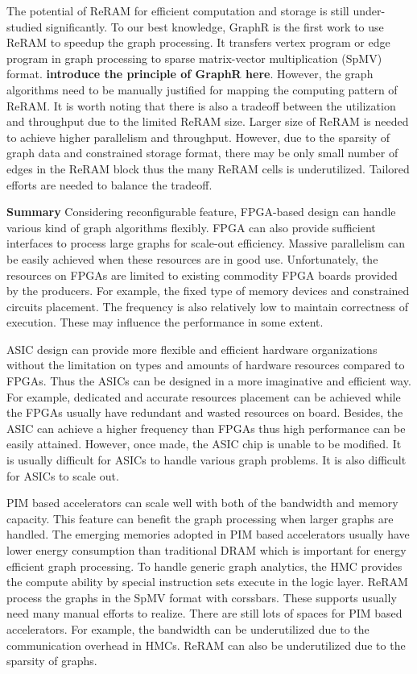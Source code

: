 \documentclass[twoside]{article}
\begin{document}
\begin{multicols}{2}
The potential of ReRAM for efficient computation and storage is still under-studied significantly. To our best knowledge, GraphR \cite{song2018graphr} is the first work to use ReRAM to speedup the graph processing. It transfers vertex program or edge program in graph processing to sparse matrix-vector multiplication (SpMV) format. {\bf introduce the principle of GraphR here}. However, the graph algorithms need to be manually justified for mapping the computing pattern of ReRAM. It is worth noting that there is also a tradeoff between the utilization and throughput due to the limited ReRAM size. Larger size of ReRAM is needed to achieve higher parallelism and throughput. However, due to the sparsity of graph data and constrained storage format, there may be only small number of edges in the ReRAM block thus the many ReRAM cells is underutilized. Tailored efforts are needed to balance the tradeoff.

{\bf Summary}
Considering reconfigurable feature, FPGA-based design can handle various kind of graph algorithms flexibly. FPGA can also provide sufficient interfaces to process large graphs for scale-out efficiency. Massive parallelism can be easily achieved when these resources are in good use. Unfortunately, the resources on FPGAs are limited to existing commodity FPGA boards provided by the producers. For example, the fixed type of memory devices and constrained circuits placement. The frequency is also relatively low to maintain correctness of execution. These may influence the performance in some extent.

ASIC design can provide more flexible and efficient hardware organizations without the limitation on types and amounts of hardware resources compared to FPGAs. Thus the ASICs can be designed in a more imaginative and efficient way. For example, dedicated and accurate resources placement can be achieved while the FPGAs usually have redundant and wasted resources on board. Besides, the ASIC can achieve a higher frequency than FPGAs thus high performance can be easily attained. However, once made, the ASIC chip is unable to be modified. It is usually difficult for ASICs to handle various graph problems. It is also difficult for ASICs to scale out.

PIM based accelerators can scale well with both of the bandwidth and memory capacity. This feature can benefit the graph processing when larger graphs are handled. The emerging memories adopted in PIM based accelerators usually have lower energy consumption than traditional DRAM which is important for energy efficient graph processing. To handle generic graph analytics, the HMC provides the compute ability by special instruction sets execute in the logic layer. ReRAM process the graphs in the SpMV format with corssbars. These supports usually need many manual efforts to realize. There are still lots of spaces for PIM based accelerators. For example, the bandwidth can be underutilized due to the communication overhead in HMCs. ReRAM can also be underutilized due to the sparsity of graphs. 


\end{multicols}
\end{document}
